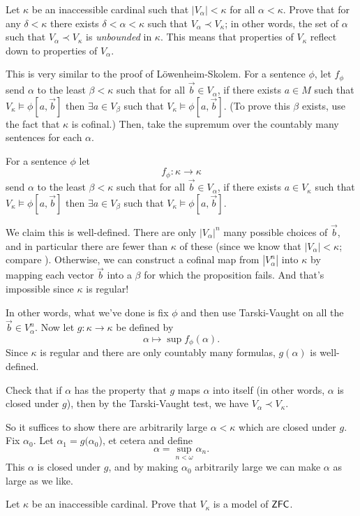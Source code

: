 \begin{dproblem}[Reflection]
	\gim
	Let $\kappa$ be an inaccessible cardinal such that $|V_\alpha| < \kappa$ for all $\alpha < \kappa$.
	Prove that for any $\delta < \kappa$ there exists $\delta < \alpha < \kappa$
	such that $V_\alpha \prec V_\kappa$; in other words,
	the set of $\alpha$ such that $V_\alpha \prec V_\kappa$ is \emph{unbounded} in $\kappa$.
	This means that properties of $V_\kappa$ reflect down to properties of $V_\alpha$.
	\begin{hint}
		This is very similar to the proof of L\"owenheim-Skolem.
		For a sentence $\phi$, let $f_\phi$
		send $\alpha$ to the least $\beta < \kappa$ such that for all $\vec b \in V_\alpha$, if there exists $a \in M$ such that $V_\kappa \vDash \phi[a, \vec b]$ then $\exists a \in V_\beta$ such that $V_\kappa \vDash \phi[a, \vec b]$.
		(To prove this $\beta$ exists, use the fact that $\kappa$ is cofinal.)
		Then, take the supremum over the countably many sentences for each $\alpha$.
	\end{hint}
	\begin{sol}
		For a sentence $\phi$ let \[ f_\phi \colon \kappa \to \kappa \]
		send $\alpha$ to the least $\beta < \kappa$ such that for all $\vec b \in V_\alpha$, if there exists $a \in V_\kappa$ such that $V_\kappa \vDash \phi[a, \vec b]$ then $\exists a \in V_\beta$ such that $V_\kappa \vDash \phi[a, \vec b]$.

		We claim this is well-defined.
		There are only $\left\lvert V_\alpha \right\rvert^n$ many possible choices of $\vec b$,
		and in particular there are fewer than $\kappa$ of these
		(since we know that $\left\lvert V_\alpha \right\rvert < \kappa$; compare ).
		Otherwise, we can construct a cofinal map from $\left\lvert V_\alpha^n \right\rvert$
		into $\kappa$ by mapping each vector $\vec b$ into a $\beta$ for which the proposition fails.
		And that's impossible since $\kappa$ is regular!

		In other words, what we've done is fix $\phi$ and then use Tarski-Vaught on all the $\vec b \in V_\alpha^n$.
		Now let $g \colon \kappa \to \kappa$ be defined by
		\[ \alpha \mapsto \sup f_\phi(\alpha). \]
		Since $\kappa$ is regular and there are only countably many formulas, $g(\alpha)$ is well-defined.

		Check that if $\alpha$ has the property that $g$ maps $\alpha$ into itself (in other words, $\alpha$ is closed under $g$), then by the Tarski-Vaught test, we have $V_\alpha \prec V_\kappa$.

		So it suffices to show there are arbitrarily large $\alpha < \kappa$ which are closed under $g$.
		Fix $\alpha_0$. Let $\alpha_1 = g(\alpha_0$), et cetera and define
		\[ \alpha = \sup_{n < \omega} \alpha_n. \]
		This $\alpha$ is closed under $g$, and by making $\alpha_0$ arbitrarily large we can make $\alpha$ as large as we like.
	\end{sol}
\end{dproblem}

\begin{sproblem}
	\label{prob:inaccessible_model}
	\gim
	Let $\kappa$ be an inaccessible cardinal.
	Prove that $V_\kappa$ is a model of $\mathsf{ZFC}$.
\end{sproblem}
